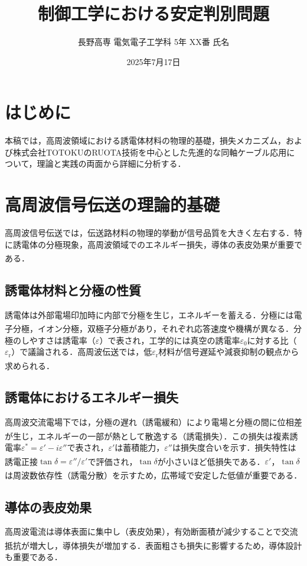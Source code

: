 \documentclass[11pt,a4paper]{ltjsarticle} %
\newcommand{\supcite}[1]{\textsuperscript{\cite{#1}}} %
\begin{document}
\title{制御工学における安定判別問題}
\author{長野高専 電気電子工学科 5年 XX番 氏名}
\date{2025年7月17日}
\maketitle
\thispagestyle{fancy}
\section{はじめに}
本稿では，高周波領域における誘電体材料の物理的基礎，損失メカニズム，および株式会社TOTOKUのRUOTA技術を中心とした先進的な同軸ケーブル応用について，理論と実践の両面から詳細に分析する．

\section{高周波信号伝送の理論的基礎}
高周波信号伝送では，伝送路材料の物理的挙動が信号品質を大きく左右する．特に誘電体の分極現象，高周波領域でのエネルギー損失，導体の表皮効果が重要である\supcite{ref1,ref2}．

\subsection{誘電体材料と分極の性質}
誘電体は外部電場印加時に内部で分極を生じ，エネルギーを蓄える．分極には電子分極，イオン分極，双極子分極があり，それぞれ応答速度や機構が異なる\supcite{ref2}．分極のしやすさは誘電率（$\varepsilon$）で表され，工学的には真空の誘電率$\varepsilon_0$に対する比（$\varepsilon_\mathrm{r}$）で議論される．高周波伝送では，低$\varepsilon_\mathrm{r}$材料が信号遅延や減衰抑制の観点から求められる\supcite{ref3}．

\subsection{誘電体におけるエネルギー損失}
高周波交流電場下では，分極の遅れ（誘電緩和）により電場と分極の間に位相差が生じ，エネルギーの一部が熱として散逸する（誘電損失）\supcite{ref1,ref4}．この損失は複素誘電率$\varepsilon^*=\varepsilon'-i\varepsilon''$で表され，$\varepsilon'$は蓄積能力，$\varepsilon''$は損失度合いを示す．損失特性は誘電正接$\tan\delta=\varepsilon''/\varepsilon'$で評価され，$\tan\delta$が小さいほど低損失である\supcite{ref4}．$\varepsilon'$，$\tan\delta$は周波数依存性（誘電分散）を示すため，広帯域で安定した低値が重要である\supcite{ref5}．

\subsection{導体の表皮効果}
高周波電流は導体表面に集中し（表皮効果），有効断面積が減少することで交流抵抗が増大し，導体損失が増加する\supcite{ref1}．表面粗さも損失に影響するため，導体設計も重要である．
\end{document}
